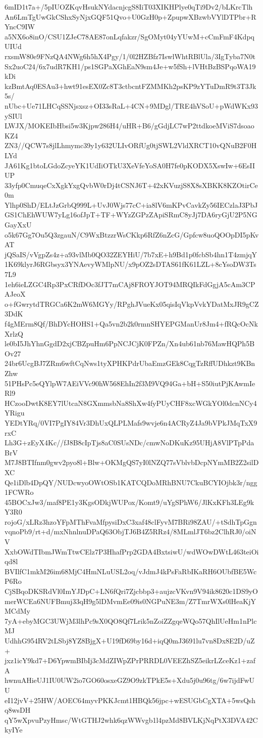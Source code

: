 6mID1t7a+/5pIUOZKqvHsukNYdacnjcgS8IiT03XIKHPlye0qTi9Dv2/bLKrcTlh
An6LmTgUwGkCShxSyNjxGQF51Qvo+U0GzH0p+ZpupwXBzwbVYlDTPbr+RYncC9IW
a5NX6o8inO/CSU1ZJeC78AE87onLqfakzr/SgOMyt04yYUwM+cCmFmF4KdpqUIUd
rxsmW80e9FNzQA4NWg6h5hX4Pgy/1/0l2HZBfz7IswlWhtRBlUla/3IgTyba7N0t
Sx2uoC24/6x7udR7KH1/ps1SGPaXGhEaN9sm4Je+w5fSh+lVHtBzBSPqoWA19kDi
kzBmtAq0ESAu3+hwt91esEX0Zc8T3ctbcntFZMMKh2psKP9zYTuDmR9t3T3Jk5s/
nUbc+Ue71LHCqSSNjsxsz+OI33sRaL+4CN+9MDgl/TRE4hVSoU+pWdWKx93ySIUl
LWJX/MOKEIbHbsi5w3Kjpw286H4/uHR+B6/gGdjLC7wP2ttdkoeMViS7dsoaoKZ4
ZN3//QCW7s8jlLhmymc39y1y632ULIvORfUg0tjSWL2VldXRCT10vQNuB2F0HLYd
JA61Kg1btoLGdoZcyeYK1UdIiOTkU3XeVfeYoSA0H7fe0pKODX5XswIw+6EsIIUP
33yfp0CmuqeCxXgkYxgQvbW0rDj4tCSNJ6T+42xKVuzjS8X8sXBKK8KZOtirCe0m
Ylhp0ShD/ELtJzGrbQ999L+UvJ0Wjs77cC+ia8lV6mKPvCavkZy56IECzlaJ3PbJ
GS1ChEhWUW7yLg16ofJpT+TF+WYzZGPzZApiSRmC8yJj7DA6ryGjU2P5NGGayXxU
o5k67Gg7Ou5Q3zgauN/C9WxBtzzrWsCKkp6RfZ6nZcG/Gpfcw8uoQOOpDI5pKvAT
jQSaIS/vVgpZs4z+a93vlMb0QO32ZEYHiU/7b7xE+h9Bd1p0fcbSb4hn1T4zmjqY
1K69klyrJ6RGbsyx3YNAevyWMlpNU/x9pOZ2sDTAS61fK61LZL+8cYsoDW3Ts7L9
1eh6ieLZGC4Rp3PxCRfDOc3fJT7mCAj8FROYJOT94MRQIkFdGgjA5cAm3CPAJeoX
o+fGwrytdTRGCa6K2mW6MGYy/RPghJVueKx05qisIqVkpVvkYDatMxJR9gCZ3DdK
f4gMErm8Qf/BhDYcHOHS1+Qa5vn2b2k0rmnSHYEPGManUr8Jm4+fRQcOcNkXrlzQ
le0bI5JhYhnGgdD2xjCBZpuHm6PpNCJCjK0FPZn/Xn4ub61nb76MawHQPh5BOv27
24br6UcgBJ7ZRm6wftCqNws1tyXPHKPdrUbaEmzGEk8CqgTzRffUDhkzt9KBnZhw
51PHsPc5eQYlpW7AEiVVc90hW568EhIn2f3M9VQ94Ga+bH+S50iutPjKAwmIeRl9
HCzooDwtK8EY7lUtcaN8GXmmsbNa8ShXw4fyPUyCHF8xcWGkYOl0dcnNCy4YRigu
YEDtYRq/0VI7PgIY84Vr3DhUxQLPLMafs9wvje6n4ACRyZ4Ja9bVPkJMqTxX9rxC
Lh3G+zEyX4Kc//fJ8B8cIpTjs8aC0SUsNDc/cmwNoDKuKz95UHjA8VlPTpPdaBrV
M7J8BTIfnm0gwv2pyo8l+Blw+OKMgQS7yI0lNZQ77sVblvbDcpNYmMB2Z2silDXC
Qe1iDlb4DpQY/NUDcwyoOWtOSb1KATCQDoMRhBNU7CkuBCYIOjbk3r/ngg1FCWRo
45BOCxJw3/maf8PE1y3KgsODkjWUPox/Komt9/uYgSPhW6/JlKxKFh3LEg9kY3R0
rojoG/xLRz3hzoYFpMThFvaMfpysiDxC3xaf48clFyvM7BRi98ZAU/+tSdhTpGgn
vqnoPb9/rt+d/mxNhnlnuDPaQ63ObjTJ6B4Z5RRz4/8MLmlJT6bz2ClhRJ0/oiNV
XxbOWdTIbmJWmTtwCElz7P3HhafPrp2GDA4BxtsiwU/wdWOwDWtL463teiOiqd8l
BVIlfC1mkM26im68MjC4HmNLuUSL2oq/vJdmJ4kPsFaRbIKaRH6OUbfBE5WcP6Ro
CjSBqoDKSRdVl0ImYJDpC+LN6fQri7Zjcbbp3+aujzcVKvn9V94ik8620c1DS9yO
merWCEa6NUFBmuj33qH9g5lDMvmEe09is0NGPuNE3m/Z7TmrWXs0lHeaKjYMCdMy
7yA+ebyMGC3UWjM3lhPc9sX0QO8Qf7Lrik5nZoiZZgqeWQo57QhIlUeHm1nPlcMJ
UdhhG954RV2tLSbj8YZ8BjgX+U19fD69by16d+iqQ0mJ3691lu7vn8Dx8E2D/uZ+
jxz1icY9kd7+D6YpwmBIbIj3cMdZIWpZPrPRRDL0VEEZhSZ5eikrLZceKz1+zafA
hwnuAHieUJ1IU0UW2io7GO60osxeGZ9O9zkTPkE5s+Xdu5j0u96tg/6w7ijdFwUU
eI12jvV+25HW/AOEC64myvPKKJcmt1HBQk56jpc+wESUGbCgXTA+5wsQshq8wsDH
qY5wXpvuPzyHmsc/WtGTHJ2whk6qzWWvgb1l4pzMd8BVLKjNqPtX3DVA42CkyIYe
